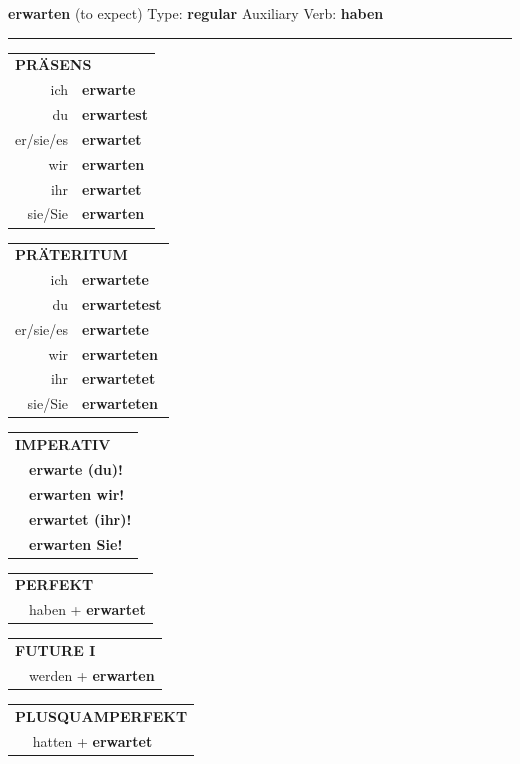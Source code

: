 \documentclass[10pt,a4paper]{revtex4-2}
\begin{document}
\begin{verbbox}
{\Large \bf erwarten} (to expect) \hfill Type: \textbf{regular} \hfill Auxiliary Verb: \textbf{haben}

\vspace{5pt}
\hrule
\vspace{5pt}

\begin{tabular}{rl}
\multicolumn{2}{l}{\textbf{PRÄSENS}}\\
ich & \textbf{erwarte}\\
du & \textbf{erwartest}\\
er/sie/es & \textbf{erwartet}\\
wir & \textbf{erwarten}\\
ihr & \textbf{erwartet}\\
sie/Sie & \textbf{erwarten}\\
\end{tabular}
\hfill
\begin{tabular}{rl}
\multicolumn{2}{l}{\textbf{PRÄTERITUM}}\\
ich & \textbf{erwartete}\\
du & \textbf{erwartetest}\\
er/sie/es & \textbf{erwartete}\\
wir & \textbf{erwarteten}\\
ihr & \textbf{erwartetet}\\
sie/Sie & \textbf{erwarteten}\\
\end{tabular}
\hfill
\begin{tabular}{rl}
\multicolumn{2}{l}{\textbf{IMPERATIV}}\\
& \textbf{erwarte (du)!}\\
& \textbf{erwarten wir!}\\
& \textbf{erwartet (ihr)!}\\
& \textbf{erwarten Sie!}\\
\end{tabular}

\vspace{10pt}

\begin{tabular}{rl}
\multicolumn{2}{l}{\textbf{PERFEKT}}\\
& haben + \textbf{erwartet}\\
\end{tabular}
\hfill
\begin{tabular}{rl}
\multicolumn{2}{l}{\textbf{FUTURE I}}\\
& werden + \textbf{erwarten}\\
\end{tabular}
\hfill
\begin{tabular}{rl}
\multicolumn{2}{l}{\textbf{PLUSQUAMPERFEKT}}\\
& hatten + \textbf{erwartet}\\
\end{tabular}


\end{verbbox}
\end{document}
